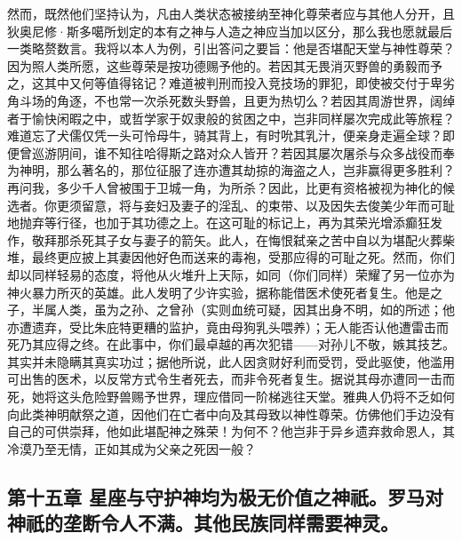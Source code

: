 然而，既然他们坚持认为，凡由人类状态被接纳至神化尊荣者应与其他人分开，且狄奥尼修·斯多噶所划定的本有之神与人造之神应当加以区分，那么我也愿就最后一类略赘数言。我将以本人为例，引出答问之要旨：他是否堪配天堂与神性尊荣？因为照人类所愿，这些尊荣是按功德赐予他的。若因其无畏消灭野兽的勇毅而予之，这其中又何等值得铭记？难道被判刑而投入竞技场的罪犯，即使被交付于卑劣角斗场的角逐，不也常一次杀死数头野兽，且更为热切么？若因其周游世界，阔绰者于愉快闲暇之中，或哲学家于奴隶般的贫困之中，岂非同样屡次完成此等旅程？难道忘了犬儒仅凭一头可怜母牛，骑其背上，有时吮其乳汁，便亲身走遍全球？即便曾巡游阴间，谁不知往哈得斯之路对众人皆开？若因其屡次屠杀与众多战役而奉为神明，那么著名的，那位征服了连亦遭其劫掠的海盗之人，岂非赢得更多胜利？再问我，多少千人曾被围于卫城一角，为所杀？因此，比更有资格被视为神化的候选者。你更须留意，将与妾妇及妻子的淫乱、的束带、以及因失去俊美少年而可耻地抛弃等行径，也加于其功德之上。在这可耻的标记上，再为其荣光增添癫狂发作，敬拜那杀死其子女与妻子的箭矢。此人，在悔恨弑亲之苦中自以为堪配火葬柴堆，最终更应披上其妻因他好色而送来的毒袍，受那应得的可耻之死。然而，你们却以同样轻易的态度，将他从火堆升上天际，如同（你们同样）荣耀了另一位亦为神火暴力所灭的英雄。此人发明了少许实验，据称能借医术使死者复生。他是之子，半属人类，虽为之孙、之曾孙（实则血统可疑，因其出身不明，如的所述；他亦遭遗弃，受比朱庇特更糟的监护，竟由母狗乳头喂养）；无人能否认他遭雷击而死乃其应得之终。在此事中，你们最卓越的再次犯错——对孙儿不敬，嫉其技艺。其实并未隐瞒其真实功过；据他所说，此人因贪财好利而受罚，受此驱使，他滥用可出售的医术，以反常方式令生者死去，而非令死者复生。据说其母亦遭同一击而死，她将这头危险野兽赐予世界，理应借同一阶梯逃往天堂。雅典人仍将不乏如何向此类神明献祭之道，因他们在亡者中向及其母致以神性尊荣。仿佛他们手边没有自己的可供崇拜，他如此堪配神之殊荣！为何不？他岂非于异乡遗弃救命恩人，其冷漠乃至无情，正如其成为父亲之死因一般？\par


\subsection{第十五章  星座与守护神均为极无价值之神祇。罗马对神祇的垄断令人不满。其他民族同样需要神灵。}

